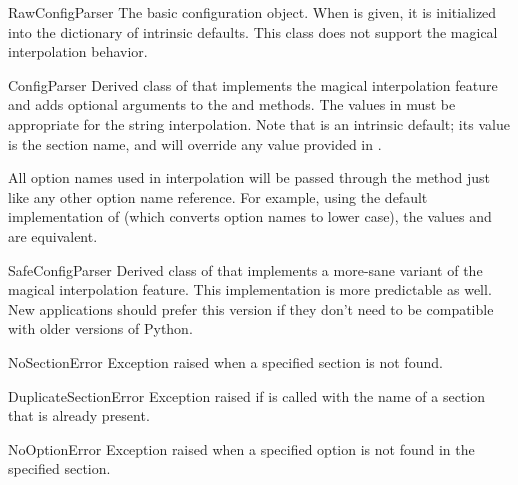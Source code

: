 \begin{classdesc}{RawConfigParser}{}
The basic configuration object.  When  is given, it is
initialized into the dictionary of intrinsic defaults.  This class
does not support the magical interpolation behavior.
\end{classdesc}

\begin{classdesc}{ConfigParser}{}
Derived class of  that implements the magical
interpolation feature and adds optional arguments to the 
and  methods.  The values in  must be
appropriate for the  string interpolation.  Note that
 is an intrinsic default; its value is the section name,
and will override any value provided in .

All option names used in interpolation will be passed through the
 method just like any other option name
reference.  For example, using the default implementation of
 (which converts option names to lower case),
the values  and  are
equivalent.
\end{classdesc}

\begin{classdesc}{SafeConfigParser}{}
Derived class of  that implements a more-sane
variant of the magical interpolation feature.  This implementation is
more predictable as well.
New applications should prefer this version if they don't need to be
compatible with older versions of Python.
\end{classdesc}

\begin{excdesc}{NoSectionError}
Exception raised when a specified section is not found.
\end{excdesc}

\begin{excdesc}{DuplicateSectionError}
Exception raised if  is called with the name of
a section that is already present.
\end{excdesc}

\begin{excdesc}{NoOptionError}
Exception raised when a specified option is not found in the specified 
section.
\end{excdesc}

